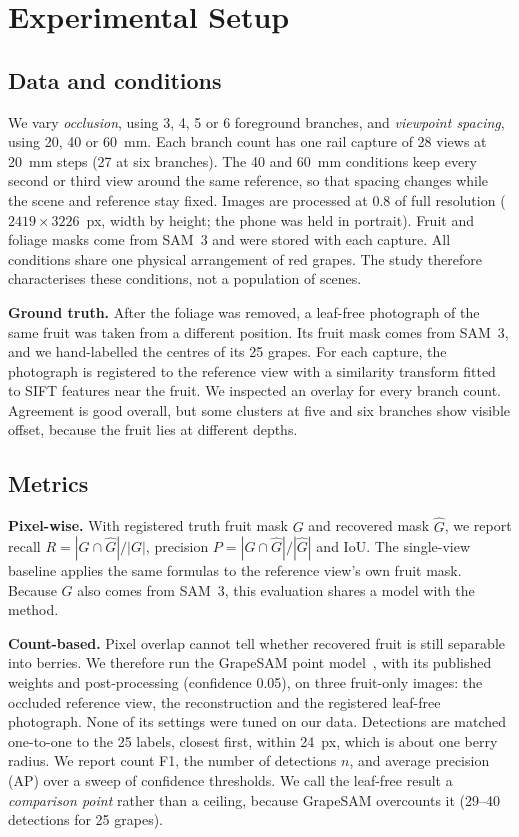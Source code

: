 \section{Experimental Setup}\label{sec:exp}
\subsection{Data and conditions}
We vary \emph{occlusion}, using 3, 4, 5 or 6 foreground branches, and \emph{viewpoint spacing}, using 20, 40 or 60~mm. Each branch count has one rail capture of 28 views at 20~mm steps (27 at six branches). The 40 and 60~mm conditions keep every second or third view around the same reference, so that spacing changes while the scene and reference stay fixed. Images are processed at 0.8 of full resolution ($2419\times3226$~px, width by height; the phone was held in portrait). Fruit and foliage masks come from SAM~3 and were stored with each capture. All conditions share one physical arrangement of red grapes. The study therefore characterises these conditions, not a population of scenes.

\textbf{Ground truth.} After the foliage was removed, a leaf-free photograph of the same fruit was taken from a different position. Its fruit mask comes from SAM~3, and we hand-labelled the centres of its 25 grapes. For each capture, the photograph is registered to the reference view with a similarity transform fitted to SIFT features near the fruit. We inspected an overlay for every branch count. Agreement is good overall, but some clusters at five and six branches show visible offset, because the fruit lies at different depths.

\subsection{Metrics}
\textbf{Pixel-wise.} With registered truth fruit mask $G$ and recovered mask $\hat G$, we report recall $R=|G\cap\hat G|/|G|$, precision $P=|G\cap\hat G|/|\hat G|$ and IoU. The single-view baseline applies the same formulas to the reference view's own fruit mask. Because $G$ also comes from SAM~3, this evaluation shares a model with the method.

\textbf{Count-based.} Pixel overlap cannot tell whether recovered fruit is still separable into berries. We therefore run the GrapeSAM point model~\cite{tong2026vivid}, with its published weights and post-processing (confidence 0.05), on three fruit-only images: the occluded reference view, the reconstruction and the registered leaf-free photograph. None of its settings were tuned on our data. Detections are matched one-to-one to the 25 labels, closest first, within 24~px, which is about one berry radius. We report count F1, the number of detections $n$, and average precision (AP) over a sweep of confidence thresholds. We call the leaf-free result a \emph{comparison point} rather than a ceiling, because GrapeSAM overcounts it (29--40 detections for 25 grapes).

